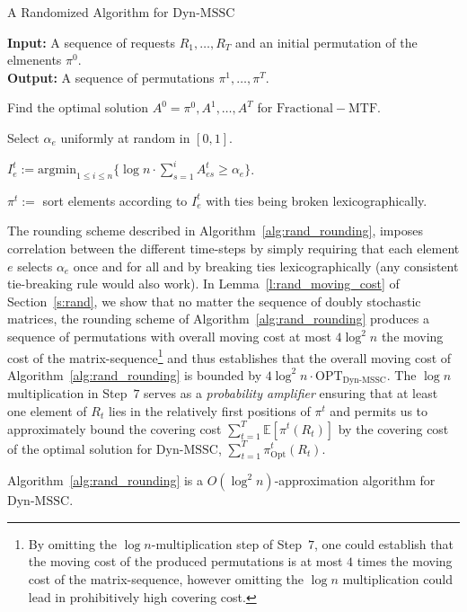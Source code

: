 \documentclass[a4paper,UKenglish,cleveref,autoref, thm-restate]{lipics-v2019}
\def\DSSC{\mathrm{Dyn}\text{-}\mathrm{MSSC}}
\begin{document}
\begin{algorithm}[h]
  \caption{A Randomized Algorithm for $\DSSC$}\label{alg:rand_rounding}
  \textbf{Input:} A sequence of requests $R_1,\ldots,R_T$ and an initial permutation of the elmenents $\pi^0$.\\
  \textbf{Output:} A sequence of permutations $\pi^1,\ldots,\pi^T$.

 \begin{algorithmic}[1]
 \STATE Find the optimal solution $A^0=\pi^0,A^1,\ldots,A^T$ for $\mathrm{Fractional-MTF}$. 

        \STATE Select $\alpha_e$ uniformly at random in $[0,1]$.
        \ENDFOR

              
                \STATE $I_e^t := \mathrm{argmin}_{1\leq i \leq n} \{ \log n \cdot \sum_{s=1}^i 
                A_{es}^t \geq \alpha_e\}$.
        \ENDFOR
            
            \STATE $\pi^t:=$ sort elements according to $I_e^t$ with ties being broken lexicographically.
\ENDFOR
  \end{algorithmic}
\end{algorithm}
The rounding scheme described in Algorithm~\ref{alg:rand_rounding}, imposes correlation between the different time-steps by simply requiring that each element $e$ selects $\alpha_e$ once and for all and by breaking ties lexicographically (any consistent tie-breaking rule would also work). In Lemma~\ref{l:rand_moving_cost} of Section~\ref{s:rand}, we show that no matter the sequence of doubly stochastic matrices, the rounding scheme of Algorithm~\ref{alg:rand_rounding} produces a sequence of permutations with overall moving cost at most $4\log^2 n$ the moving cost of the matrix-sequence\footnote{By omitting 
the $\log n$-multiplication step of Step~$7$, one could establish that the moving cost of the produced permutations is at most $4$ times the moving cost of the matrix-sequence, however omitting the $\log n$ multiplication could lead in prohibitively high covering cost.} and thus establishes that the overall moving cost of Algorithm~\ref{alg:rand_rounding} is bounded by $4\log^2 n \cdot \mathrm{OPT}_{\DSSC}$. The $\log n$ multiplication in Step~$7$ serves as a \textit{probability amplifier} ensuring that at least one element of $R_t$ lies in the relatively first positions of $\pi^t$ and permits us to approximately bound the covering cost $\sum_{t=1}^T \mathbb{E}\left[\pi^t(R_t) \right]$ by the covering cost of the optimal solution for $\DSSC$,
$\sum_{t=1}^T \pi_\mathrm{Opt}^t(R_t)$.
\begin{theorem}\label{t:rand}
Algorithm~\ref{alg:rand_rounding} is a $O(\log^2 n)$-approximation algorithm for $\DSSC$.
\end{theorem}
\end{document}
